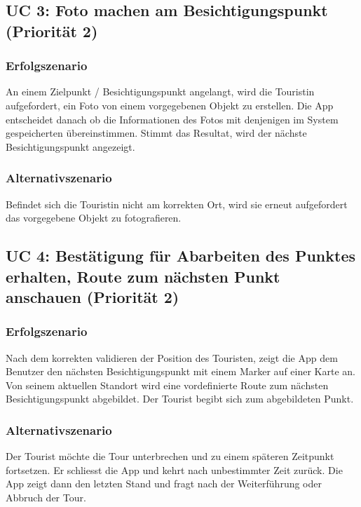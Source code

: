\documentclass[a4paper,10pt,xetex]{article}
\begin{document}
\subsection{UC 3: Foto machen am Besichtigungspunkt (Priorität 2)}\label{uc-3-user-macht-foto-am-besichtigungspunkt-priorituxe4t-2}
\subsubsection{Erfolgszenario}\label{erfolgszenario-1}
An einem Zielpunkt / Besichtigungspunkt angelangt, wird die Touristin aufgefordert, ein Foto von einem vorgegebenen Objekt zu erstellen. Die
App entscheidet danach ob die Informationen des Fotos mit denjenigen im
System gespeicherten übereinstimmen. Stimmt das Resultat, wird der
nächste Besichtigungspunkt angezeigt.


\subsubsection{Alternativszenario}\label{alternativszenario}
Befindet sich die Touristin nicht am korrekten Ort, wird sie erneut
aufgefordert das vorgegebene Objekt zu fotografieren.


\subsection{UC 4: Bestätigung für Abarbeiten des Punktes erhalten, Route zum nächsten Punkt anschauen (Priorität 2)}\label{uc-4-user-bekommt-bestuxe4tigung-fuxfcr-das-abarbeiten-des-punktes-die-route-zum-nuxe4chsten-punkt-wird-angezeigt.-priorituxe4t-2}
\subsubsection{Erfolgszenario}\label{erfolgszenario-2}
Nach dem korrekten validieren der Position des Touristen, zeigt die App
dem Benutzer den nächsten Besichtigungspunkt mit einem Marker auf einer
Karte an. Von seinem aktuellen Standort wird eine vordefinierte Route
zum nächsten Besichtigungspunkt abgebildet. Der Tourist begibt sich zum
abgebildeten Punkt.


\subsubsection{Alternativszenario}\label{alternativszenario-1}
Der Tourist möchte die Tour unterbrechen und zu einem späteren
Zeitpunkt fortsetzen. Er schliesst die App und kehrt nach unbestimmter
Zeit zurück. Die App zeigt dann den letzten Stand und fragt nach der
Weiterführung oder Abbruch der Tour.
\end{document}
